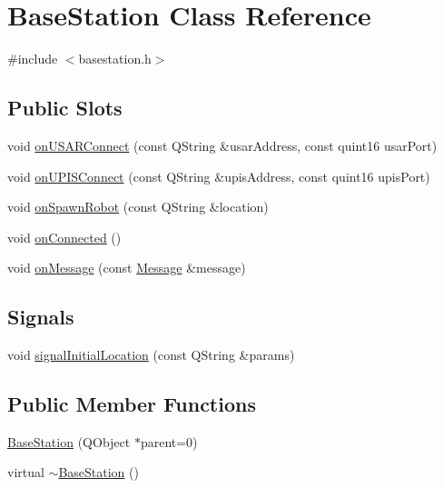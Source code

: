 \hypertarget{classBaseStation}{
\section{BaseStation Class Reference}
\label{classBaseStation}
}


{\ttfamily \#include $<$basestation.h$>$}

\subsection*{Public Slots}
\begin{DoxyCompactItemize}
\item 
void \hyperlink{classBaseStation_a2631f0dbae32d3a10927e2f18d3ead58}{onUSARConnect} (const QString \&usarAddress, const quint16 usarPort)
\item 
void \hyperlink{classBaseStation_aca664e65d1e0e3b990b3106fd600de41}{onUPISConnect} (const QString \&upisAddress, const quint16 upisPort)
\item 
void \hyperlink{classBaseStation_a990cb61a39abf47ca0d85ceca7d73d4e}{onSpawnRobot} (const QString \&location)
\item 
void \hyperlink{classBaseStation_a730b89786800009e9db8786731079a14}{onConnected} ()
\item 
void \hyperlink{classBaseStation_ab5ae8f091793b66c08fc4a0347421d43}{onMessage} (const \hyperlink{classMessage}{Message} \&message)
\end{DoxyCompactItemize}
\subsection*{Signals}
\begin{DoxyCompactItemize}
\item 
void \hyperlink{classBaseStation_aa2cb3b3f3427ac36070d0ad3f7683d52}{signalInitialLocation} (const QString \&params)
\end{DoxyCompactItemize}
\subsection*{Public Member Functions}
\begin{DoxyCompactItemize}
\item 
\hyperlink{classBaseStation_a83693a6c16e49c70f6f6e4f1e069be53}{BaseStation} (QObject $\ast$parent=0)
\item 
virtual \hyperlink{classBaseStation_a212490a9b30dec2eee3aa623cb88320a}{$\sim$BaseStation} ()
\end{DoxyCompactItemize}


